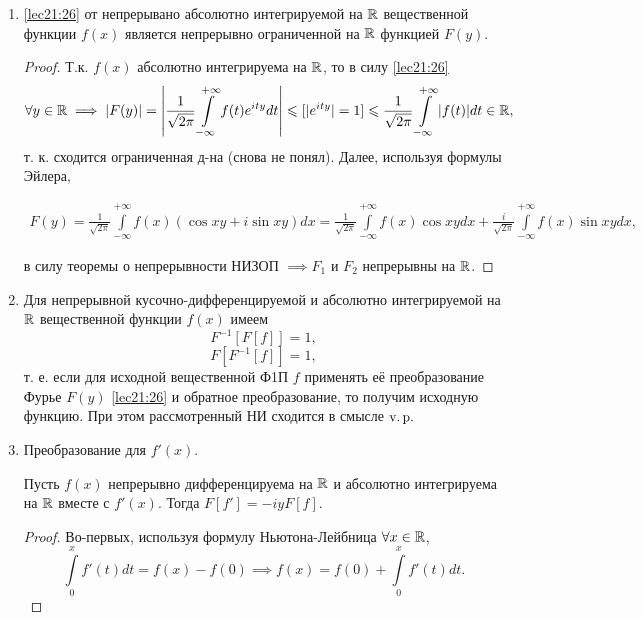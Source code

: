 \documentclass[../../main.tex]{subfiles}
\newcommand{\intii}{\int\limits_{-\infty}^{+\infty}}
\begin{document}
\begin{enumerate}
  \item \eqref{lec21:26} от непрерывано абсолютно интегрируемой на $\mathbb{R}$ 
  вещественной функции $f(x)$ является непрерывно ограниченной на $\mathbb{R}$ функцией 
  $F(y)$.
  \begin{proof}
    Т.к. $f(x)$ абсолютно интегрируема на $\mathbb{R}$, то в силу \eqref{lec21:26}
    \begin{multline*}
      \forall y \in \R \implies |F(y)| = \left|\frac{1}{\sqrt{2\pi}} \intii 
      f(t)e^{ity}dt\right| \leq [|e^{ity}| = 1] \leq \frac{1}{\sqrt{2\pi}} 
      \intii|f(t)|dt \in \R,
    \end{multline*}
    т. к. сходится ограниченная д-на (снова не понял). Далее, используя 
    формулы Эйлера,
    
    \begin{multline*}
      F(y) = \frac{1}{\sqrt{2\pi}} \intii f(x) (\cos xy + i\sin xy)dx = 
      \frac{1}{\sqrt{2\pi}} \intii f(x) \cos xy dx + \frac{i}{\sqrt{2\pi}} 
      \intii f(x) \sin xy dx,
    \end{multline*}
    
    в силу теоремы о непрерывности НИЗОП $\implies F_1$ и $F_2$ непрерывны на 
    $\mathbb{R}$.
  \end{proof}
  
  \item Для непрерывной кусочно-дифференцируемой и абсолютно интегрируемой 
  на $\mathbb{R}$ вещественной функции $f(x)$ имеем  \[F^{-1}[F[f]] = 1,\] 
  \[F[F^{-1}[f]] = 1,\] т. е. если для исходной вещественной Ф1П $f$ 
  применять её преобразование Фурье $F(y)$ \eqref{lec21:26} и обратное 
  преобразование, то получим исходную функцию. При этом рассмотренный НИ 
  сходится в смысле $\operatorname{v.p.}$
  
  \item Преобразование для $f'(x)$.
  
  Пусть $f(x)$ непрерывно дифференцируема на $\mathbb{R}$ и абсолютно интегрируема 
  на $\mathbb{R}$ вместе с $f'(x)$. Тогда $F[f'] = -iyF[f]$.
  
  \begin{proof}
    Во-первых, используя формулу Ньютона-Лейбница $\forall x \in \mathbb{R}$,
    \begin{equation}
      \label{lec21:28}
      \int\limits_{0}^{x}f
      '(t)dt = f(x) - f(0) \implies f(x) = f(0) + \int\limits_{0}^{x}f'(t)dt.
    \end{equation}
    

\end{proof}
\end{enumerate}
\end{document}
